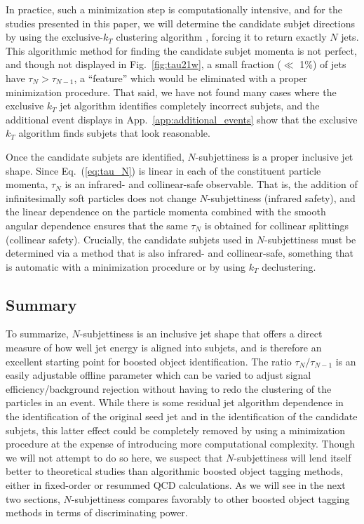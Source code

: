 \documentclass{JHEP3}
\DeclareRobustCommand{\App}[1]{App.~\ref{#1}}
\DeclareRobustCommand{\Fig}[1]{Fig.~\ref{#1}}
\DeclareRobustCommand{\Eq}[1]{Eq.~(\ref{#1})}
\begin{document}
In practice, such a minimization step is computationally intensive, and for the studies presented in this paper, we will determine the candidate subjet directions by using the exclusive-$k_T$ clustering algorithm \cite{Catani:1993hr,Ellis:1993tq}, forcing it to return exactly $N$ jets.   This algorithmic method for finding the candidate subjet momenta is not perfect, and though not displayed in \Fig{fig:tau21w}, a small fraction ($\ll$ 1\%) of jets have $\tau_{N} > \tau_{N-1}$, a ``feature'' which would be eliminated with a proper minimization procedure.  That said, we have not found many cases where the exclusive $k_T$ jet algorithm identifies completely incorrect subjets, and the additional event displays in \App{app:additional_events} show that the exclusive $k_T$ algorithm finds subjets that look reasonable.


Once the candidate subjets are identified, $N$-subjettiness is a proper inclusive jet shape. Since \Eq{eq:tau_N} is linear in each of the constituent particle momenta, $\tau_N$ is an infrared- and collinear-safe observable.  That is, the addition of infinitesimally soft particles does not change $N$-subjettiness (infrared safety), and the linear dependence on the particle momenta combined with the smooth angular dependence ensures that the same $\tau_N$ is obtained for collinear splittings (collinear safety).  Crucially, the candidate subjets used in $N$-subjettiness must be determined via a method that is also  infrared- and collinear-safe, something that is automatic with a minimization procedure or by using $k_T$ declustering.  

\subsection{Summary}

To summarize, $N$-subjettiness is an inclusive jet shape that offers a direct measure of how well jet energy is aligned into subjets, and is therefore an excellent starting point for boosted object identification.  The ratio $\tau_N/\tau_{N-1}$ is an easily adjustable offline parameter which can be varied to adjust signal efficiency/background rejection without having to redo the clustering of the particles in an event.  While there is some residual jet algorithm dependence in the identification of the original seed jet and in the identification of the candidate subjets, this latter effect could be completely removed by using a minimization procedure at the expense of introducing more computational complexity.  Though we will not attempt to do so here, we suspect that $N$-subjettiness will lend itself better to theoretical studies than algorithmic boosted object tagging methods, either in fixed-order or resummed QCD calculations.   As we will see in the next two sections, $N$-subjettiness compares favorably to other boosted object tagging methods in terms of discriminating power.  
\end{document}
